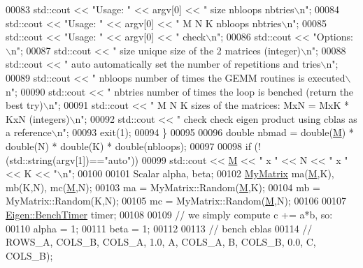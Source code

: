 \begin{DoxyCode}
{{{00083     std::cout << \textcolor{stringliteral}{"Usage: "} << argv[0] << \textcolor{stringliteral}{" size nbloops nbtries\(\backslash\)n"};
00084     std::cout << \textcolor{stringliteral}{"Usage: "} << argv[0] << \textcolor{stringliteral}{" M N K nbloops nbtries\(\backslash\)n"};
00085     std::cout << \textcolor{stringliteral}{"Usage: "} << argv[0] << \textcolor{stringliteral}{" check\(\backslash\)n"};
00086     std::cout << \textcolor{stringliteral}{"Options:\(\backslash\)n"};
00087     std::cout << \textcolor{stringliteral}{"    size       unique size of the 2 matrices (integer)\(\backslash\)n"};
00088     std::cout << \textcolor{stringliteral}{"    auto       automatically set the number of repetitions and tries\(\backslash\)n"};
00089     std::cout << \textcolor{stringliteral}{"    nbloops    number of times the GEMM routines is executed\(\backslash\)n"};
00090     std::cout << \textcolor{stringliteral}{"    nbtries    number of times the loop is benched (return the best try)\(\backslash\)n"};
00091     std::cout << \textcolor{stringliteral}{"    M N K      sizes of the matrices: MxN  =  MxK * KxN (integers)\(\backslash\)n"};
00092     std::cout << \textcolor{stringliteral}{"    check      check eigen product using cblas as a reference\(\backslash\)n"};
00093     exit(1);
00094   \}
00095 
00096   \textcolor{keywordtype}{double} nbmad = double(\hyperlink{group___core___module_class_eigen_1_1_matrix}{M}) * double(N) * double(K) * double(nbloops);
00097 
00098   \textcolor{keywordflow}{if} (!(std::string(argv[1])==\textcolor{stringliteral}{"auto"}))
00099     std::cout << \hyperlink{group___core___module_class_eigen_1_1_matrix}{M} << \textcolor{stringliteral}{" x "} << N << \textcolor{stringliteral}{" x "} << K << \textcolor{stringliteral}{"\(\backslash\)n"};
00100 
00101   Scalar alpha, beta;
00102   \hyperlink{group___core___module_class_eigen_1_1_matrix}{MyMatrix} ma(\hyperlink{group___core___module_class_eigen_1_1_matrix}{M},K), mb(K,N), mc(\hyperlink{group___core___module_class_eigen_1_1_matrix}{M},N);
00103   ma = MyMatrix::Random(\hyperlink{group___core___module_class_eigen_1_1_matrix}{M},K);
00104   mb = MyMatrix::Random(K,N);
00105   mc = MyMatrix::Random(\hyperlink{group___core___module_class_eigen_1_1_matrix}{M},N);
00106 
00107   \hyperlink{class_eigen_1_1_bench_timer}{Eigen::BenchTimer} timer;
00108 
00109   \textcolor{comment}{// we simply compute c += a*b, so:}
00110   alpha = 1;
00111   beta = 1;
00112 
00113   \textcolor{comment}{// bench cblas}
00114   \textcolor{comment}{// ROWS\_A, COLS\_B, COLS\_A, 1.0,  A, COLS\_A, B, COLS\_B, 0.0, C, COLS\_B);}
}}}
\end{DoxyCode}
